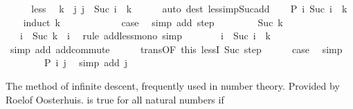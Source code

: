 \begin{isabellebody}
%
\isadelimproof
%
\endisadelimproof
%
\isatagproof
{}\isamarkupfalse%
\ {\isacharminus}{\kern0pt}\isanewline
\ \ \isamarkupfalse%
\ less\ \isamarkupfalse%
\ k\ \ j{\isacharcolon}{\kern0pt}\ {\isachardoublequoteopen}j\ {\isacharequal}{\kern0pt}\ Suc\ {\isacharparenleft}{\kern0pt}i\ {\isacharplus}{\kern0pt}\ k{\isacharparenright}{\kern0pt}{\isachardoublequoteclose}\isanewline
\ \ \ \ \isamarkupfalse%
\ {\isacharparenleft}{\kern0pt}auto\ dest{\isacharcolon}{\kern0pt}\ less{\isacharunderscore}{\kern0pt}imp{\isacharunderscore}{\kern0pt}Suc{\isacharunderscore}{\kern0pt}add{\isacharparenright}{\kern0pt}\isanewline
\ \ \isamarkupfalse%
\ {\isachardoublequoteopen}P\ i\ {\isacharparenleft}{\kern0pt}Suc\ {\isacharparenleft}{\kern0pt}i\ {\isacharplus}{\kern0pt}\ k{\isacharparenright}{\kern0pt}{\isacharparenright}{\kern0pt}{\isachardoublequoteclose}\isanewline
\ \ \isamarkupfalse%
\ {\isacharparenleft}{\kern0pt}induct\ k{\isacharparenright}{\kern0pt}\isanewline
\ \ \ \ \isamarkupfalse%
\ {}\isanewline
\ \ \ \ \isamarkupfalse%
\ {\isacharquery}{\kern0pt}case\ \isamarkupfalse%
\ {\isacharparenleft}{\kern0pt}simp\ add{\isacharcolon}{\kern0pt}\ step{\isacharparenright}{\kern0pt}\isanewline
\ \ \isamarkupfalse%
\isanewline
\ \ \ \ \isamarkupfalse%
\ {\isacharparenleft}{\kern0pt}Suc\ k{\isacharparenright}{\kern0pt}\isanewline
\ \ \ \ \isamarkupfalse%
\ {\isachardoublequoteopen}{}\ {\isacharplus}{\kern0pt}\ i\ {\isacharless}{\kern0pt}\ Suc\ k\ {\isacharplus}{\kern0pt}\ i{\isachardoublequoteclose}\ \isamarkupfalse%
\ {\isacharparenleft}{\kern0pt}rule\ add{\isacharunderscore}{\kern0pt}less{\isacharunderscore}{\kern0pt}mono{}{\isacharparenright}{\kern0pt}\ simp\isanewline
\ \ \ \ \isamarkupfalse%
\ \isamarkupfalse%
\ {\isachardoublequoteopen}i\ {\isacharless}{\kern0pt}\ Suc\ {\isacharparenleft}{\kern0pt}i\ {\isacharplus}{\kern0pt}\ k{\isacharparenright}{\kern0pt}{\isachardoublequoteclose}\ \isamarkupfalse%
\ {\isacharparenleft}{\kern0pt}simp\ add{\isacharcolon}{\kern0pt}\ add{\isachardot}{\kern0pt}commute{\isacharparenright}{\kern0pt}\isanewline
\ \ \ \ \isamarkupfalse%
\ trans{\isacharbrackleft}{\kern0pt}OF\ this\ lessI\ Suc\ step{\isacharbrackright}{\kern0pt}\isanewline
\ \ \ \ \isamarkupfalse%
\ {\isacharquery}{\kern0pt}case\ \isamarkupfalse%
\ simp\isanewline
\ \ \isamarkupfalse%
\isanewline
\ \ \isamarkupfalse%
\ \isamarkupfalse%
\ {\isachardoublequoteopen}P\ i\ j{\isachardoublequoteclose}\ \isamarkupfalse%
\ {\isacharparenleft}{\kern0pt}simp\ add{\isacharcolon}{\kern0pt}\ j{\isacharparenright}{\kern0pt}\isanewline
{}\isamarkupfalse%
%
\endisatagproof
{\isafoldproof}%
%
\isadelimproof
%
\endisadelimproof
%
\begin{isamarkuptext}%
The method of infinite descent, frequently used in number theory.
Provided by Roelof Oosterhuis.
 is true for all natural numbers if


\end{isamarkuptext}
\end{isabellebody}
